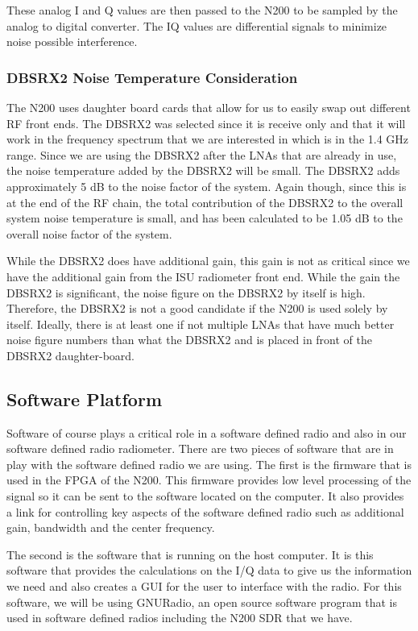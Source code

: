 These analog I and Q values are then passed to the N200 to be sampled by the analog to digital converter.  The IQ values are differential signals to minimize noise possible interference.

\subsubsection{DBSRX2 Noise Temperature Consideration}

The N200 uses daughter board cards that allow for us to easily swap out different RF front ends.  The DBSRX2 was selected since it is receive only and that it will work in the frequency spectrum that we are interested in which is in the 1.4 GHz range.  Since we are using the DBSRX2 after the LNAs that are already in use, the noise temperature added by the DBSRX2 will be small.  The DBSRX2 adds approximately 5 dB to the noise factor of the system.  Again though, since this is at the end of the RF chain, the total contribution of the DBSRX2 to the overall system noise temperature is small, and has been calculated to be 1.05 dB to the overall noise factor of the system.

While the DBSRX2 does have additional gain, this gain is not as critical since we have the additional gain from the ISU radiometer front end.  While the gain the DBSRX2 is significant, the noise figure on the DBSRX2 by itself is high.  Therefore, the DBSRX2 is not a good candidate if the N200 is used solely by itself.  Ideally, there is at least one if not multiple LNAs that have much better noise figure numbers than what the DBSRX2 and is placed in front of the DBSRX2 daughter-board. 

\subsection{Software Platform} 

Software of course plays a critical role in a software defined radio and also in our software defined radio radiometer.  There are two pieces of software that are in play with the software defined radio we are using.  The first is the firmware that is used in the FPGA of the N200.  This firmware provides low level processing of the signal so it can be sent to the software located on the computer.  It also provides a link for controlling key aspects of the software defined radio such as additional gain, bandwidth and the center frequency.

The second is the software that is running on the host computer.  It is this software that provides the calculations on the I/Q data to give us the information we need and also creates a GUI for the user to interface with the radio.  For this software, we will be using GNURadio, an open source software program that is used in software defined radios including the N200 SDR that we have.  

